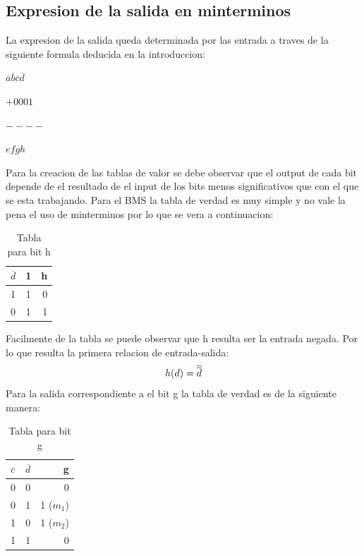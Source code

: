 	\subsection{Expresion de la salida en minterminos}
		\hspace{10mm} La expresion de la salida queda determinada por las entrada a traves de la siguiente formula deducida en la introduccion:
		\newline \centerline{$\overline{a} \overline{b} \overline{c} \overline{d}$}
		\newline \centerline{$+0001$}
		\newline \centerline{$----$}
		\newline \centerline{$efgh$}	
		\newline \hspace{10mm} Para la creacion de las tablas de valor se debe observar que el output de cada bit depende de el resultado de el input de los bits menos significativos que con el que se esta trabajando.
		\newline Para el BMS la tabla de verdad es muy simple y no vale la pena el uso de minterminos por lo que se vera a continuacion:
		\begin{table}[h!]
			\begin{center}
				\caption{Tabla para bit h}
				\begin{tabular}{l|c|r}
				\textbf{$\overline{d}$} & \textbf{1} & \textbf{h}\\
				\hline
				1 & 1 & 0 \\
				0 & 1 & 1 \\			
				\end{tabular}
			\end{center}
		\end{table}
		\newline Facilmente de la tabla se puede observar que h resulta ser la entrada negada. Por lo que resulta la primera relacion de entrada-salida:
		\begin{equation}
			\centerline{$h(d)=\overline{\overline{d}}$}
		\end{equation}
		\newline Para la salida correspondiente a el bit g la tabla de verdad es de la siguiente manera:
		\begin{table}[h!]
			\begin{center}
				\caption{Tabla para bit g}
				\begin{tabular}{l|c|r}
				\textbf{$\overline{c}$} & \textbf{$\overline{d}$} & \textbf{g}\\
				\hline
				0 & 0 & 0 \\
				0 & 1 & 1 ($m_{1}$) \\	
				1 & 0 & 1 ($m_{2}$)\\
				1 & 1 & 0 \\			
				\end{tabular}
			\end{center}
		\end{table}	

